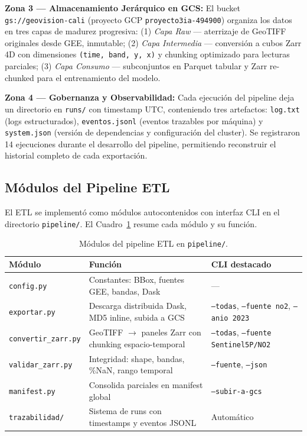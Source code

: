 \documentclass[10pt,a4paper,twocolumn]{article}
\begin{document}
\textbf{Zona 3 --- Almacenamiento Jerárquico en GCS:} El bucket \texttt{gs://geovision-cali} (proyecto GCP \texttt{proyecto3ia-494900}) organiza los datos en tres capas de madurez progresiva: (1) \textit{Capa Raw} --- aterrizaje de GeoTIFF originales desde GEE, inmutable; (2) \textit{Capa Intermedia} --- conversión a cubos Zarr 4D con dimensiones \texttt{(time, band, y, x)} y chunking optimizado para lecturas parciales; (3) \textit{Capa Consumo} --- subconjuntos en Parquet tabular y Zarr re-chunked para el entrenamiento del modelo.

\textbf{Zona 4 --- Gobernanza y Observabilidad:} Cada ejecución del pipeline deja un directorio en \texttt{runs/} con timestamp UTC, conteniendo tres artefactos: \texttt{log.txt} (logs estructurados), \texttt{eventos.jsonl} (eventos trazables por máquina) y \texttt{system.json} (versión de dependencias y configuración del cluster). Se registraron 14 ejecuciones durante el desarrollo del pipeline, permitiendo reconstruir el historial completo de cada exportación.

\subsection{Módulos del Pipeline ETL}

El ETL se implementó como módulos autocontenidos con interfaz CLI en el directorio \texttt{pipeline/}. El Cuadro~\ref{tab:modulos} resume cada módulo y su función.

\begin{table}[H]
  \centering
  \scriptsize
  \begin{tabular}{p{1.7cm}p{2.5cm}p{3.2cm}}
    \toprule
    \textbf{Módulo} & \textbf{Función} & \textbf{CLI destacado} \\
    \midrule
    \texttt{config.py} & Constantes: BBox, fuentes GEE, bandas, Dask & --- \\
    \texttt{exportar.py} & Descarga distribuida Dask, MD5 inline, subida a GCS & \texttt{--todas}, \texttt{--fuente no2}, \texttt{--anio 2023} \\
    \texttt{convertir\_}\newline\texttt{zarr.py} & GeoTIFF $\to$ paneles Zarr con chunking espacio-temporal & \texttt{--todas}, \texttt{--fuente Sentinel5P/NO2} \\
    \texttt{validar\_zarr.py} & Integridad: shape, bandas, \%NaN, rango temporal & \texttt{--fuente}, \texttt{--json} \\
    \texttt{manifest.py} & Consolida parciales en manifest global & \texttt{--subir-a-gcs} \\
    \texttt{trazabilidad/} & Sistema de runs con timestamps y eventos JSONL & Automático \\
    \bottomrule
  \end{tabular}
  \caption{Módulos del pipeline ETL en \texttt{pipeline/}.}
  \label{tab:modulos}
\end{table}
\end{document}
